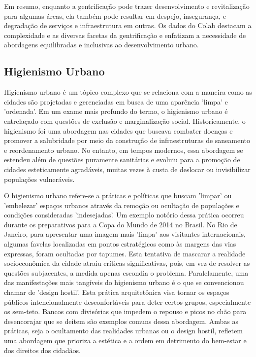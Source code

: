 Em resumo, enquanto a gentrificação pode trazer desenvolvimento e revitalização para algumas áreas, ela também pode resultar em despejo, insegurança, e degradação de serviços e infraestrutura em outras. Os dados do Colab destacam a complexidade e as diversas facetas da gentrificação e enfatizam a necessidade de abordagens equilibradas e inclusivas ao desenvolvimento urbano.

\subsection{Higienismo Urbano}

Higienismo urbano é um tópico complexo que se relaciona com a maneira como as cidades são projetadas e gerenciadas em busca de uma aparência 'limpa' e 'ordenada'. Em um exame mais profundo do termo, o higienismo urbano é entrelaçado com questões de exclusão e marginalização social. Historicamente, o higienismo foi uma abordagem nas cidades que buscava combater doenças e promover a salubridade por meio da construção de infraestruturas de saneamento e reordenamento urbano. No entanto, em tempos modernos, essa abordagem se estendeu além de questões puramente sanitárias e evoluiu para a promoção de cidades esteticamente agradáveis, muitas vezes à custa de deslocar ou invisibilizar populações vulneráveis.

O higienismo urbano refere-se a práticas e políticas que buscam 'limpar' ou 'embelezar' espaços urbanos através da remoção ou ocultação de populações e condições consideradas 'indesejadas'. Um exemplo notório dessa prática ocorreu durante os preparativos para a Copa do Mundo de 2014 no Brasil. No Rio de Janeiro, para apresentar uma imagem mais 'limpa' aos visitantes internacionais, algumas favelas localizadas em pontos estratégicos como às margens das vias expressas, foram ocultadas por tapumes. Esta tentativa de mascarar a realidade socioeconômica da cidade atraiu críticas significativas, pois, em vez de resolver as questões subjacentes, a medida apenas escondia o problema. Paralelamente, uma das manifestações mais tangíveis do higienismo urbano é o que se convencionou chamar de 'design hostil'. Esta prática arquitetônica visa tornar os espaços públicos intencionalmente desconfortáveis para deter certos grupos, especialmente os sem-teto. Bancos com divisórias que impedem o repouso e picos no chão para desencorajar que se deitem são exemplos comuns dessa abordagem. Ambas as práticas, seja o ocultamento das realidades urbanas ou o design hostil, refletem uma abordagem que prioriza a estética e a ordem em detrimento do bem-estar e dos direitos dos cidadãos.

